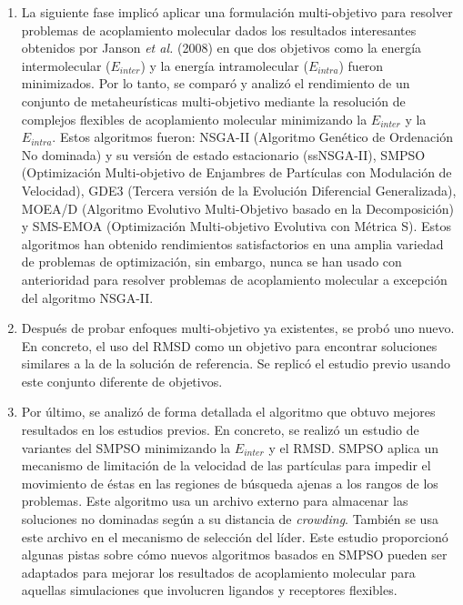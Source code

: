 \begin{enumerate}
	\item La siguiente fase implicó aplicar una formulación multi-objetivo para resolver problemas de acoplamiento molecular dados los resultados interesantes obtenidos por Janson \emph{et al.} (2008) en que dos objetivos como la energía intermolecular ($E_{inter}$) y la energía intramolecular ($E_{intra}$) fueron minimizados. Por lo tanto, se comparó y analizó el rendimiento de un conjunto de metaheurísticas multi-objetivo mediante la resolución de complejos flexibles de acoplamiento molecular minimizando la $E_{inter}$ y la $E_{intra}$. Estos algoritmos fueron: NSGA-II (Algoritmo Genético de Ordenación No dominada) y su versión de estado estacionario (ssNSGA-II), SMPSO (Optimización Multi-objetivo de Enjambres de Partículas con Modulación de Velocidad), GDE3 (Tercera versión de la Evolución Diferencial Generalizada), MOEA/D (Algoritmo Evolutivo Multi-Objetivo basado en la Decomposición) y SMS-EMOA (Optimización Multi-objetivo Evolutiva con Métrica S). Estos algoritmos han obtenido rendimientos satisfactorios en una amplia variedad de problemas de optimización, sin embargo, nunca se han usado con anterioridad para resolver problemas de acoplamiento molecular a excepción del algoritmo NSGA-II.
	
	\item Después de probar enfoques multi-objetivo ya existentes, se probó uno nuevo. En concreto, el uso del RMSD como un objetivo para encontrar soluciones similares a la de la solución de referencia. Se replicó el estudio previo usando este conjunto diferente de objetivos.
	
	\item Por último, se analizó de forma detallada el algoritmo que obtuvo mejores resultados en los estudios previos. En concreto, se realizó un estudio de variantes del SMPSO minimizando la $E_{inter}$ y el RMSD. SMPSO aplica un mecanismo de limitación de la velocidad de las partículas para impedir el movimiento de éstas en las regiones de búsqueda ajenas a los rangos de los problemas. Este algoritmo usa un archivo externo para almacenar las soluciones no dominadas según a su distancia de \emph{crowding}. También se usa este archivo en el mecanismo de selección del líder. Este estudio proporcionó algunas pistas sobre cómo nuevos algoritmos basados en SMPSO pueden ser adaptados para mejorar los resultados de acoplamiento molecular para aquellas simulaciones que involucren ligandos y receptores flexibles.
	
\end{enumerate}

